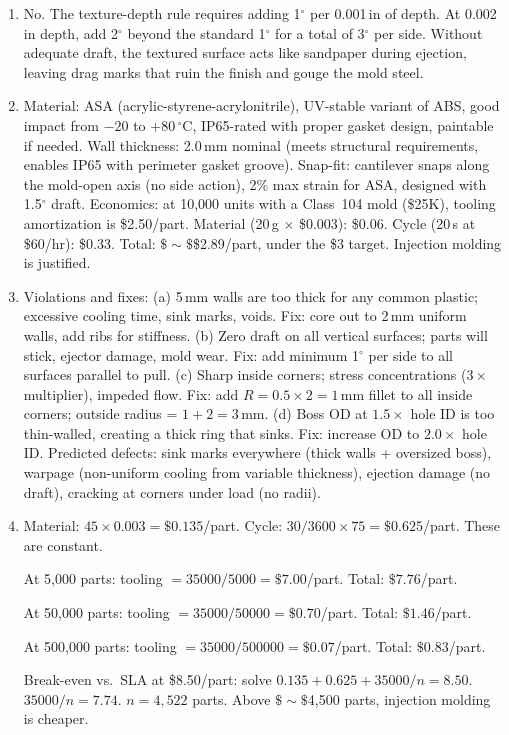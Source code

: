\documentclass[11pt,letterpaper,twoside,openany]{book}
\newcommand{\degC}{\ensuremath{{}^{\circ}\text{C}}}
\providecommand{\ang}[1]{#1\ensuremath{{}^{\circ}}}
\begin{document}
\begin{enumerate}[leftmargin=1.5em]
  \item No. The texture-depth rule requires adding \ang{1} per 0.001\,in of depth. At 0.002\,in depth, add \ang{2} beyond the standard \ang{1} for a total of \ang{3} per side. Without adequate draft, the textured surface acts like sandpaper during ejection, leaving drag marks that ruin the finish and gouge the mold steel.

  \item Material: ASA (acrylic-styrene-acrylonitrile), UV-stable variant of ABS, good impact from $-20$ to $+80$\,\degC, IP65-rated with proper gasket design, paintable if needed. Wall thickness: 2.0\,mm nominal (meets structural requirements, enables IP65 with perimeter gasket groove). Snap-fit: cantilever snaps along the mold-open axis (no side action), 2\% max strain for ASA, designed with \ang{1.5} draft. Economics: at 10,000 units with a Class~104 mold (\$25K), tooling amortization is \$2.50/part. Material (20\,g $\times$ \$0.003): \$0.06. Cycle (20\,s at \$60/hr): \$0.33. Total: $\$\sim\$$\$2.89/part, under the \$3 target. Injection molding is justified.

  \item Violations and fixes: (a) 5\,mm walls are too thick for any common plastic; excessive cooling time, sink marks, voids. Fix: core out to 2\,mm uniform walls, add ribs for stiffness. (b) Zero draft on all vertical surfaces; parts will stick, ejector damage, mold wear. Fix: add minimum \ang{1} per side to all surfaces parallel to pull. (c) Sharp inside corners; stress concentrations ($3\times$ multiplier), impeded flow. Fix: add $R = 0.5 \times 2 = 1$\,mm fillet to all inside corners; outside radius = $1 + 2 = 3$\,mm. (d) Boss OD at $1.5\times$ hole ID is too thin-walled, creating a thick ring that sinks. Fix: increase OD to $2.0\times$ hole ID. Predicted defects: sink marks everywhere (thick walls + oversized boss), warpage (non-uniform cooling from variable thickness), ejection damage (no draft), cracking at corners under load (no radii).

  \item Material: $45 \times 0.003 = \$0.135$/part. Cycle: $30/3600 \times 75 = \$0.625$/part. These are constant.

  At 5,000 parts: tooling $= 35000/5000 = \$7.00$/part. Total: $\$7.76$/part.

  At 50,000 parts: tooling $= 35000/50000 = \$0.70$/part. Total: $\$1.46$/part.

  At 500,000 parts: tooling $= 35000/500000 = \$0.07$/part. Total: $\$0.83$/part.

  Break-even vs.\ SLA at \$8.50/part: solve $0.135 + 0.625 + 35000/n = 8.50$. $35000/n = 7.74$. $n = 4,522$ parts. Above $\$\sim\$$4,500 parts, injection molding is cheaper.
\end{enumerate}
\end{document}
